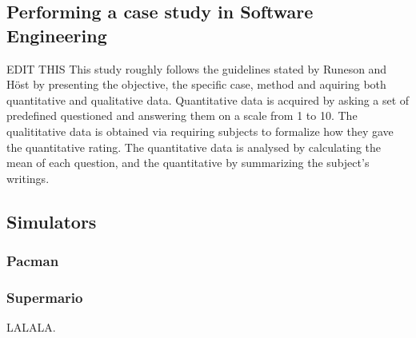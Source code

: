 \subsection{Performing a case study in Software Engineering}
EDIT THIS
This study roughly follows the guidelines stated by Runeson and Höst \cite{CaseStudyGuidelines} by presenting the objective, the specific case, method and aquiring both quantitative and qualitative data. Quantitative data is acquired by asking a set of predefined questioned and answering them on a scale from 1 to 10. The qualititative data is obtained via requiring subjects to formalize how they gave the quantitative rating.
The quantitative data is analysed by calculating the mean of each question, and the quantitative by summarizing the subject's writings. 


\subsection{Simulators}

\subsubsection{Pacman}

\subsubsection{Supermario}
LALALA.

